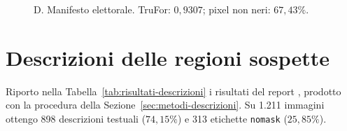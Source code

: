 \begin{minipage}{\linewidth}
\begin{subfigure}{\linewidth}
        \captionsetup{labelformat=empty}
        \caption{D. Manifesto elettorale. TruFor: $0{,}9307$; pixel non neri: $67{,}43\%$.}
    \end{subfigure}
    \caption[Mascheramento degli esempi A, B, C e D]{Mascheramento degli esempi A, B, C e D. I pixel neri indicano le regioni escluse. Fonti: A, \href{https://commons.wikimedia.org/wiki/File:Politician_in_front_of_Ueda_station.jpg}{Syced}; B, \href{https://commons.wikimedia.org/wiki/File:Rakesh_Brahma,_EM_Bodoland_Territorial_Region.jpg}{Swrang Borgoary}; C, \href{https://commons.wikimedia.org/wiki/File:South_Korean_politician_조승래.jpg}{Rickinasia}; D, \href{https://commons.wikimedia.org/wiki/File:Young_Politician_Naseer_Giade.jpg}{Naseer001}.}
    \label{fig:maschere-esempi}
\end{minipage}
\bigskip

\section{Descrizioni delle regioni sospette}
\label{sec:risultati-descrizioni}

Riporto nella Tabella~\ref{tab:risultati-descrizioni} i risultati del report , prodotto con la procedura della Sezione~\ref{sec:metodi-descrizioni}. Su 1.211 immagini ottengo 898 descrizioni testuali ($74{,}15\%$) e 313 etichette \texttt{nomask} ($25{,}85\%$).


